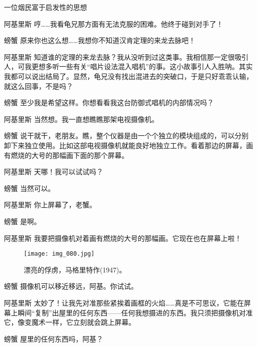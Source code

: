 \begin{dialog}{一位烟民富于启发性的思想}
\begin{dialogue}
\item[阿基里斯]哼……我看龟兄那方面有无法克服的困难。他终于碰到对手了！

\item[螃蟹]原来你也这么想……我想你不知道汉肯定理的来龙去脉吧！

\item[阿基里斯]知道谁的定理的来龙去脉？我从没听到过这类事。我相信那一定很吸引人，可我更想多听一些有关“唱片设法混入唱机”的事。这小故事引人入胜呐。其实我都可以说出结局了。显然，龟兄没有找出混进去的突破口，于是只好乖乖认输，就这么回事，不是吗？

\item[螃蟹]至少我是希望这样。你想看看我这台防御式唱机的内部情况吗？

\item[阿基里斯]当然想。我一直想瞧瞧那架电视摄像机。

\item[螃蟹]说干就干，老朋友。瞧，整个仪器是由一个个独立的模块组成的，可以分别卸下来独立使用。比如这部电视摄像机就能良好地独立工作。看着那边的屏幕，画有燃烧的大号的那幅画下面的那个屏幕。

\item[阿基里斯]天哪！我可以试试吗？

\item[螃蟹]当然可以。

\item[阿基里斯]你上屏幕了，老蟹。

\item[螃蟹]是啊。

\item[阿基里斯]我要把摄像机对着画有燃烧的大号的那幅画。它现在也在屏幕上啦！

\begin{figure}
\texttt{[image: img\_080.jpg]}
\caption[漂亮的俘虏，马格里特作。]
  {漂亮的俘虏，马格里特作(1947)。}
\end{figure}

\item[螃蟹]摄像机可以移近移远，阿基。你试试。

\item[阿基里斯]太妙了！让我先对准那些紧挨着画框的火焰……真是不可思议，它能在屏幕上瞬间“复制”出屋里的任何东西——任何我想摄进的东西。我只须把摄像机对准它，像变魔术一样，它立刻就会跳上屏幕。

\item[螃蟹]屋里的任何东西吗，阿基？


\end{dialogue}
\end{dialog}
